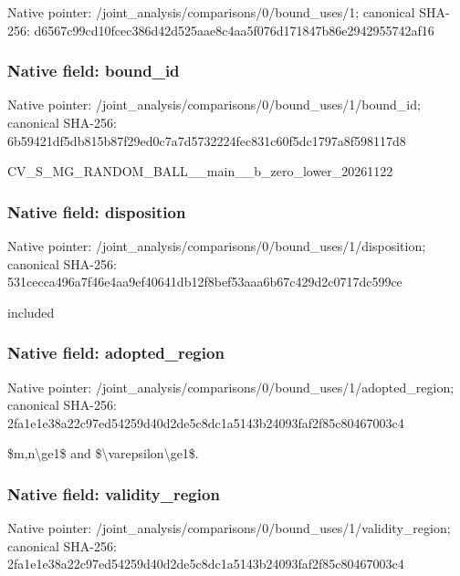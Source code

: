 \documentclass[10pt,a4paper]{article}
\begin{document}
Native pointer: /joint\_analysis/comparis\allowbreak{}ons/0/bound\_uses/1; canonical SHA-256: d6567c99cd10fcec386d42d5\allowbreak{}25aae8c4aa5f076d171847b8\allowbreak{}6e2942955742af16



\subsubsection{Native field: bound\_id}


Native pointer: /joint\_analysis/comparis\allowbreak{}ons/0/bound\_uses/1/bound\allowbreak{}\_id; canonical SHA-256: 6b59421df5db815b87f29ed0\allowbreak{}c7a7d5732224fec831c60f5d\allowbreak{}c1797a8f598117d8


CV\_S\_MG\_RANDOM\_BALL\_\_mai\allowbreak{}n\_\_b\_zero\_lower\_20261122


\subsubsection{Native field: disposition}


Native pointer: /joint\_analysis/comparis\allowbreak{}ons/0/bound\_uses/1/dispo\allowbreak{}sition; canonical SHA-256: 531cecca496a7f46e4aa9ef4\allowbreak{}0641db12f8bef53aaa6b67c4\allowbreak{}29d2c0717dc599ce


included


\subsubsection{Native field: adopted\_region}


Native pointer: /joint\_analysis/comparis\allowbreak{}ons/0/bound\_uses/1/adopt\allowbreak{}ed\_region; canonical SHA-256: 2fa1e1e38a22c97ed54259d4\allowbreak{}0d2de5c8dc1a5143b24093fa\allowbreak{}f2f85c80467003c4


\$m,n\textbackslash{}ge1\$ and \$\textbackslash{}varepsilon\textbackslash{}ge1\$.


\subsubsection{Native field: validity\_region}


Native pointer: /joint\_analysis/comparis\allowbreak{}ons/0/bound\_uses/1/valid\allowbreak{}ity\_region; canonical SHA-256: 2fa1e1e38a22c97ed54259d4\allowbreak{}0d2de5c8dc1a5143b24093fa\allowbreak{}f2f85c80467003c4
\end{document}
